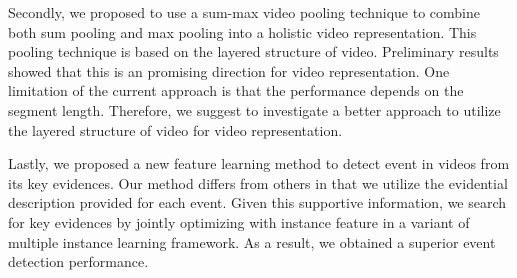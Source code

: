 	Secondly, we proposed to use a sum-max video pooling technique to combine both sum pooling and max pooling into a holistic video representation. This pooling technique is based on the layered structure of video. Preliminary results showed that this is an promising direction for video representation. One limitation of the current approach is that the performance depends on the segment length. Therefore, we suggest to investigate a better approach to utilize the layered structure of video for video representation.
	
	Lastly, we proposed a new feature learning method to detect event in videos from its key evidences. Our method differs from others in that we utilize the evidential description provided for each event. Given this supportive information, we search for key evidences by jointly optimizing with instance feature in a variant of multiple instance learning framework. As a result, we obtained a superior event detection performance.
	
